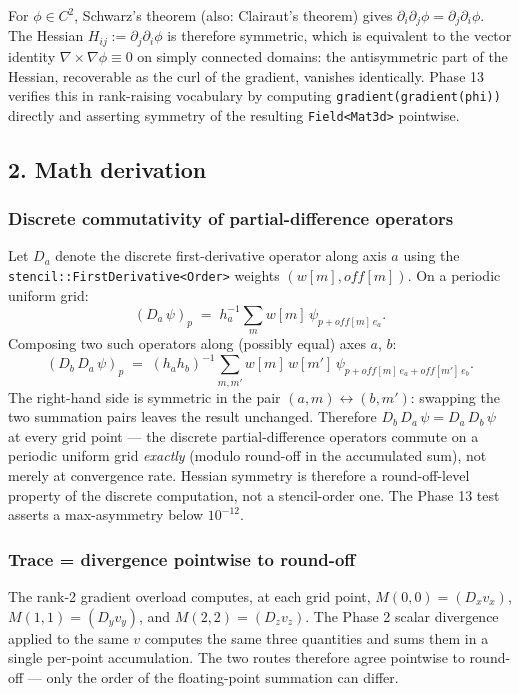 For \(\phi \in C^2\), Schwarz's theorem (also: Clairaut's theorem)
gives
\(\partial_i\partial_j\phi = \partial_j\partial_i\phi\). The Hessian
\(H_{ij} := \partial_j\partial_i\phi\) is therefore symmetric, which
is equivalent to the vector identity
\(\nabla\times\nabla\phi \equiv 0\) on simply connected domains:
the antisymmetric part of the Hessian, recoverable as the curl of the
gradient, vanishes identically. Phase 13 verifies this in
rank-raising vocabulary by computing
\passthrough{\lstinline!gradient(gradient(phi))!} directly and
asserting symmetry of the resulting
\passthrough{\lstinline!Field<Mat3d>!} pointwise.

\subsection{2. Math derivation}\label{phase13-math}

\subsubsection{Discrete commutativity of partial-difference
operators}\label{phase13-commute}

Let \(D_a\) denote the discrete first-derivative operator along axis
\(a\) using the
\passthrough{\lstinline!stencil::FirstDerivative<Order>!} weights
\((w[m], \mathit{off}[m])\). On a periodic uniform grid:
\[
(D_a\,\psi)_p \;=\; h_a^{-1} \sum_m w[m]\,\psi_{p + \mathit{off}[m]\,e_a}.
\]
Composing two such operators along (possibly equal) axes \(a\), \(b\):
\[
(D_b\,D_a\,\psi)_p \;=\; (h_a h_b)^{-1} \sum_{m, m'} w[m]\,w[m']\,\psi_{p + \mathit{off}[m]\,e_a + \mathit{off}[m']\,e_b}.
\]
The right-hand side is symmetric in the pair \((a, m) \leftrightarrow
(b, m')\): swapping the two summation pairs leaves the result
unchanged. Therefore \(D_b\,D_a\,\psi = D_a\,D_b\,\psi\) at every
grid point — the discrete partial-difference operators commute on a
periodic uniform grid \emph{exactly} (modulo round-off in the
accumulated sum), not merely at convergence rate. Hessian symmetry is
therefore a round-off-level property of the discrete computation, not
a stencil-order one. The Phase 13 test asserts a max-asymmetry below
\(10^{-12}\).

\subsubsection{Trace = divergence pointwise to
round-off}\label{phase13-trace}

The rank-2 gradient overload computes, at each grid point,
\(M(0, 0) = (D_x v_x)\), \(M(1, 1) = (D_y v_y)\), and
\(M(2, 2) = (D_z v_z)\). The Phase 2 scalar divergence applied to the
same \(v\) computes the same three quantities and sums them in a
single per-point accumulation. The two routes therefore agree
pointwise to round-off — only the order of the floating-point
summation can differ.

